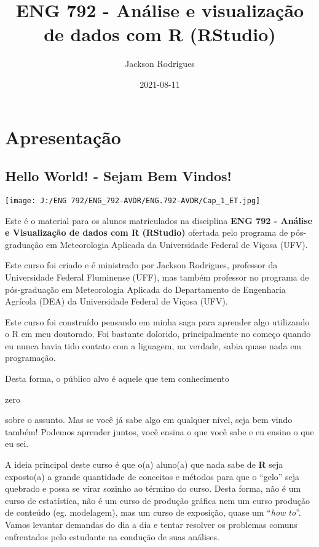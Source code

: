 \documentclass[
]{book}
\title{ENG 792 - Análise e visualização de dados com R (RStudio)}
\author{Jackson Rodrigues}
\date{2021-08-11}
\begin{document}
\maketitle

{
\setcounter{tocdepth}{1}
\tableofcontents
}
\hypertarget{apresentauxe7uxe3o}{%
\chapter{Apresentação}\label{apresentauxe7uxe3o}}

\hypertarget{hello-world---sejam-bem-vindos}{%
\section{Hello World! - Sejam Bem Vindos!}\label{hello-world---sejam-bem-vindos}}

\texttt{[image: J:/ENG 792/ENG\_792-AVDR/ENG.792-AVDR/Cap\_1\_ET.jpg]}

Este é o material para os alunos matriculados na disciplina \textbf{ENG 792 - Análise e Visualização de dados com R (RStudio)} ofertada pelo programa de pós-graduação em Meteorologia Aplicada da Universidade Federal de Viçosa (UFV).

Este curso foi criado e é ministrado por Jackson Rodrigues, professor da Universidade Federal Fluminense (UFF), mas também professor no programa de pós-graduação em Meteorologia Aplicada do Departamento de Engenharia Agrícola (DEA) da Universidade Federal de Viçosa (UFV).

Este curso foi construído pensando em minha saga para aprender algo utilizando o R em meu doutorado. Foi bastante dolorido, principalmente no começo quando eu nunca havia tido contato com a liguagem, na verdade, sabia quase nada em programação.

Desta forma, o público alvo é aquele que tem conhecimento

zero

sobre o assunto. Mas se você já sabe algo em qualquer nível, seja bem vindo também! Podemos aprender juntos, você ensina o que você sabe e eu ensino o que eu sei.

A ideia principal deste curso é que o(a) aluno(a) que nada sabe de \textbf{R} seja exposto(a) a grande quantidade de conceitos e métodos para que o ``gelo'' seja quebrado e possa se virar sozinho ao término do curso. Desta forma, não é um curso de estatística, não é um curso de produção gráfica nem um curso produção de conteúdo (eg. modelagem), mas um curso de exposição, quase um ``\emph{how to}''. Vamos levantar demandas do dia a dia e tentar resolver os problemas comuns enfrentados pelo estudante na condução de suas análises.
\end{document}
